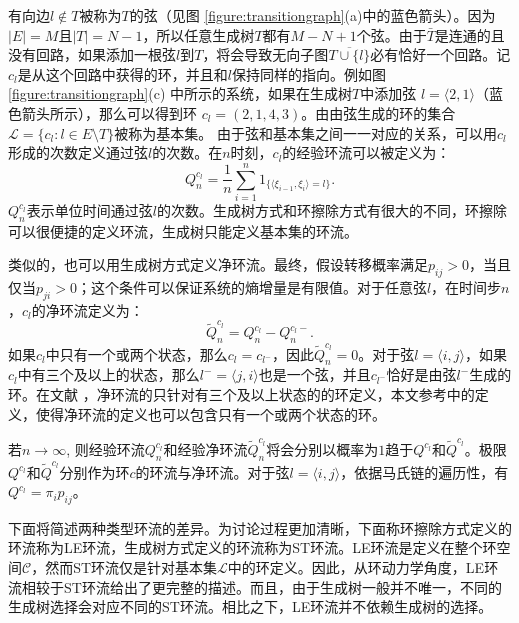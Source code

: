 有向边$l \notin T$被称为$T$的弦（见图 \ref{figure:transitiongraph}(a)中的蓝色箭头）。因为$|E|=M$且$|T|= N-1$，所以任意生成树$T$都有$M-N+1$个弦。由于$\bar{T}$是连通的且没有回路，如果添加一根弦$l$到$T$，将会导致无向子图$\overline{T \cup \{l\}}$必有恰好一个回路。记$c_l$是从这个回路中获得的环，并且和$l$保持同样的指向。例如图 \ref{figure:transitiongraph}(c) 中所示的系统，如果在生成树$T$中添加弦 $l=\langle 2,1 \rangle$（蓝色箭头所示），那么可以得到环 $c_l=(2,1,4,3)$。由由弦生成的环的集合$\mathcal{L} = \{c_l: l\in E\setminus T\}$被称为基本集。
由于弦和基本集之间一一对应的关系，可以用$c_l$形成的次数定义通过弦$l$的次数。在$n$时刻，$c_l$的经验环流可以被定义为：
\begin{equation*}
    Q^{c_l}_n = \frac{1}{n}\sum_{i=1}^n1_{\{\langle\xi_{i-1},\xi_i\rangle=l\}}.
\end{equation*}
$Q^{c_l}_n$表示单位时间通过弦$l$的次数。生成树方式和环擦除方式有很大的不同，环擦除可以很便捷的定义环流，生成树只能定义基本集的环流。

类似的，也可以用生成树方式定义净环流。最终，假设转移概率满足$p_{ij}>0$，当且仅当$p_{ji}>0$；这个条件可以保证系统的熵增量是有限值\cite{Schnakenberg1976NetworkTO,jiang2004mathematical}。对于任意弦$l$，在时间步$n$，$c_l$的净环流定义为：
\begin{equation*}
    \tilde{Q}^{c_l}_n=Q^{c_l}_n-Q^{c_l-}_n.
\end{equation*}
如果$c_l$中只有一个或两个状态，那么$c_l = c_{l^-}$，因此$\tilde{Q}_n^{c_l}=0$。对于弦$l=\langle i,j \rangle$，如果$c_l$中有三个及以上的状态，那么$l^-=\langle j,i\rangle$也是一个弦，并且$c_{l^-}$恰好是由弦$l^-$生成的环。在文献 \cite{Schnakenberg1976NetworkTO, andrieux2007fluctuation, andrieux2007network}，净环流的只针对有三个及以上状态的的环定义，本文参考\cite{kalpazidou2007cycle}中的定义，使得净环流的定义也可以包含只有一个或两个状态的环。

若$n \to \infty$, 则经验环流$Q_n^{c_l}$和经验净环流$\tilde{Q}_n^{c_l}$将会分别以概率为$1$趋于$Q^{c_l}$和$\tilde{Q}^{c_l}$。极限$Q^{c_l}$和$\tilde{Q}^{c_l}$分别作为环$c$的环流与净环流。对于弦$l=\langle i,j \rangle$，依据马氏链的遍历性，有$Q^{c_l} = \pi_i p_{ij}$。

下面将简述两种类型环流的差异。为讨论过程更加清晰，下面称环擦除方式定义的环流称为LE环流，生成树方式定义的环流称为ST环流。LE环流是定义在整个环空间$\mathcal{C}$，然而ST环流仅是针对基本集$\mathcal{L}$中的环定义。因此，从环动力学角度，LE环流相较于ST环流给出了更完整的描述。而且，由于生成树一般并不唯一，不同的生成树选择会对应不同的ST环流。相比之下，LE环流并不依赖生成树的选择。

